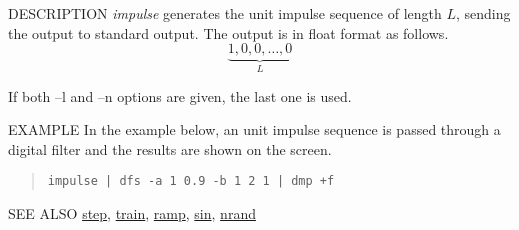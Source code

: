 \begin{synopsis}
\item[impulse] [ --l $L$ ] [ --n $N$ ]
\end{synopsis}

\begin{qsection}{DESCRIPTION}
{\em impulse} generates the unit impulse sequence of length $L$, 
sending the output to standard output. 
The output is in float format as follows.
\begin{displaymath}
\underbrace{1, 0, 0, \dots, 0}_{L}
\end{displaymath}

If both --l and --n options are given, the last one is used.
\end{qsection}

\begin{options}
\end{options}

\begin{qsection}{EXAMPLE}
In the example below, an unit impulse sequence is passed through 
a digital filter and the results are shown on the screen.
\begin{quote}
 \verb!impulse | dfs -a 1 0.9 -b 1 2 1 | dmp +f!
\end{quote}
\end{qsection}

\begin{qsection}{SEE ALSO}
\hyperlink{step}{step},
\hyperlink{train}{train},
\hyperlink{ramp}{ramp},
\hyperlink{sin}{sin},
\hyperlink{nrand}{nrand}
\end{qsection}

